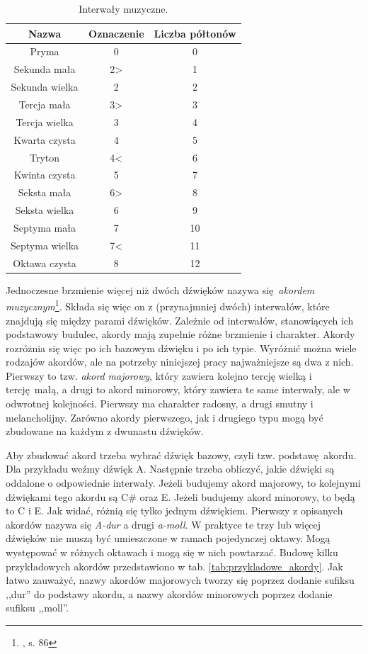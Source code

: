 \begin{table}[htb]
    \centering
    \caption{Interwały muzyczne.}
    \label{tab:interwaly}
    \begin{tabular}{|c|c|c|} \hline
        Nazwa & Oznaczenie & Liczba półtonów \\ \hline
        Pryma           & 0     & 0  \\
        Sekunda mała    & 2>    & 1  \\
        Sekunda wielka  & 2     & 2  \\
        Tercja mała     & 3>    & 3  \\
        Tercja wielka   & 3     & 4  \\
        Kwarta czysta   & 4     & 5  \\
        Tryton          & 4<    & 6  \\
        Kwinta czysta   & 5     & 7  \\
        Seksta mała     & 6>    & 8  \\
        Seksta wielka   & 6     & 9  \\
        Septyma mała    & 7     & 10 \\
        Septyma wielka  & 7<    & 11 \\
        Oktawa czysta   & 8     & 12 \\ \hline
    \end{tabular}
\end{table}

Jednoczesne brzmienie więcej niż dwóch dźwięków nazywa się \emph{akordem muzycznym}\footnote{\cite{lerch_introduction_2012}, s. 86}. Składa się więc on z (przynajmniej dwóch) interwałów, które znajdują się między parami dźwięków. Zależnie od interwałów, stanowiących ich podstawowy budulec, akordy mają zupełnie różne brzmienie i charakter. Akordy rozróżnia się więc po ich bazowym dźwięku i po ich typie. Wyróżnić można wiele rodzajów akordów, ale na potrzeby niniejszej pracy najważniejsze są dwa z nich.  Pierwszy to tzw. \emph{akord majorowy}, który zawiera kolejno tercję wielką i tercję małą, a drugi to akord minorowy, który zawiera te same interwały, ale w odwrotnej kolejności. Pierwszy ma charakter radosny, a drugi smutny i melancholijny. Zarówno akordy pierwszego, jak i drugiego typu mogą być zbudowane na każdym z dwunastu dźwięków. 

Aby zbudować akord trzeba wybrać dźwięk bazowy, czyli tzw. podstawę akordu. Dla przykładu weźmy dźwięk A. Następnie trzeba obliczyć, jakie dźwięki są oddalone o odpowiednie interwały. Jeżeli budujemy akord majorowy, to kolejnymi dźwiękami tego akordu są C\# oraz E. Jeżeli budujemy akord minorowy, to będą to C i E. Jak widać, różnią się tylko jednym dźwiękiem. Pierwszy z opisanych akordów nazywa się \emph{A-dur} a drugi \emph{a-moll}. W praktyce te trzy lub więcej dźwięków nie muszą być umieszczone w ramach pojedynczej oktawy. Mogą występować w różnych oktawach i mogą się w nich powtarzać. Budowę kilku przykładowych akordów przedstawiono w tab. \ref{tab:przykladowe_akordy}. Jak łatwo zauważyć, nazwy akordów majorowych tworzy się poprzez dodanie sufiksu ,,dur'' do podstawy akordu, a nazwy akordów minorowych poprzez dodanie sufiksu ,,moll''.

